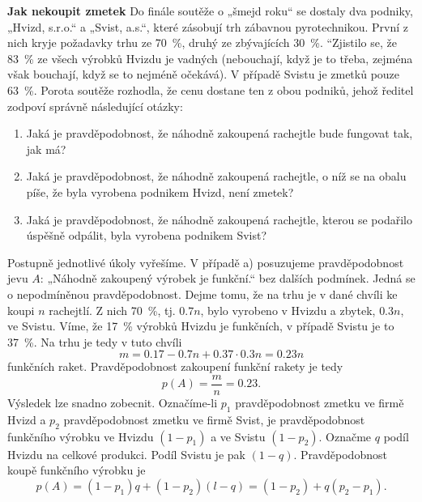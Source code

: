 \wikitextrule
\begin{example}\label{mai:exam058}
  \textbf{Jak nekoupit zmetek}\newline\small
    Do finále soutěže o „šmejd roku“ se dostaly dva podniky, „Hvizd, s.r.o.“ a „Svist, a.s.“, které 
    zásobují trh zábavnou pyrotechnikou. První z nich kryje požadavky trhu ze \SI{70}{\percent}, 
    druhý ze zbývajících \SI{30}{\percent}. “Zjistilo se, že \SI{83}{\percent} ze všech výrobků 
    Hvizdu je vadných (nebouchají, když je to třeba, zejména však bouchají, když se to
    nejméně očekává). V případě Svistu je zmetků pouze \SI{63}{\percent}. Porota soutěže rozhodla, 
    že cenu dostane ten z obou podniků, jehož ředitel zodpoví správně následující otázky:
    \begin{enumerate}
     \item Jaká je pravděpodobnost, že náhodně zakoupená rachejtle bude fungovat tak, jak má?
     \item Jaká je pravděpodobnost, že náhodně zakoupená rachejtle, o níž se na obalu píše, že byla 
     vyrobena podnikem Hvizd, není zmetek?
     \item Jaká je pravděpodobnost, že náhodně zakoupená rachejtle, kterou se podařilo úspěšně 
     odpálit, byla vyrobena podnikem Svist?
    \end{enumerate} 
    Postupně jednotlivé úkoly vyřešíme.
    V případě a) posuzujeme pravděpodobnost jevu \(A\): „Náhodně zakoupený výrobek je funkční.“ bez 
    dalších podmínek. Jedná se o nepodmíněnou pravděpodobnost. Dejme tomu, že na trhu je v dané 
    chvíli ke koupi \(n\) rachejtlí. Z nich \SI{70}{\percent}, tj. \(\num{0.7}n\), bylo vyrobeno v 
    Hvizdu a zbytek, \(\num{0.3}n\), ve Svistu. Víme, že \SI{17}{\percent} výrobků Hvizdu je 
    funkčních, v případě Svistu je to \SI{37}{\percent}. Na trhu je tedy v tuto chvíli
    \begin{equation*}
      m = \num{0.17} - \num{0.7}n + \num{0.37}\cdot\num{0.3}n = \num{0.23}n
    \end{equation*}
    funkčních raket. Pravděpodobnost zakoupení funkční rakety je tedy
    \begin{equation*}
      p(A) = \dfrac{m}{n} = \num{0.23}.
    \end{equation*}
    Výsledek lze snadno zobecnit. Označíme-li \(p_1\) pravděpodobnost zmetku ve firmě Hvizd a 
    \(p_2\) pravděpodobnost zmetku ve firmě Svist, je pravděpodobnost funkčního výrobku ve Hvizdu 
    \((1 - p_1)\) a ve Svistu \((1 - p_2)\). Označme \(q\) podíl Hvizdu na celkové produkci. Podíl 
    Svistu je pak \((1 - q)\). Pravděpodobnost koupě funkčního výrobku je
    \begin{equation*}
      p(A) = (1 - p_1)q + (1 - p_2)(l - q) = (1 - p_2) + q(p_2 - p_1).
    \end{equation*}
    

\end{example}
